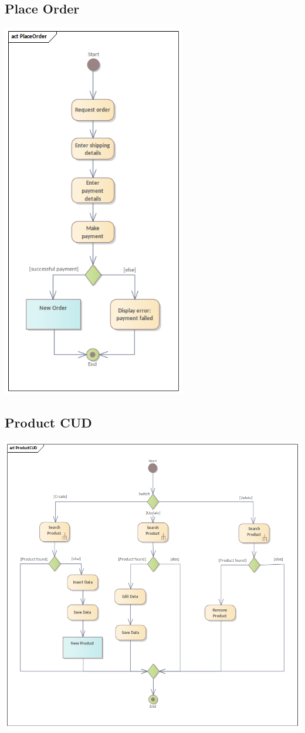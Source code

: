 \subsection{Place Order}
\begin{center}
  \includegraphics[width=0.6\textwidth]{immagini/Analisi/ActivityDiagrams/PlaceOrder.png}
\end{center}

\subsection{Product CUD}
\begin{center}
  \includegraphics[width=\textwidth]{immagini/Analisi/ActivityDiagrams/ProductCUD.png}
\end{center}